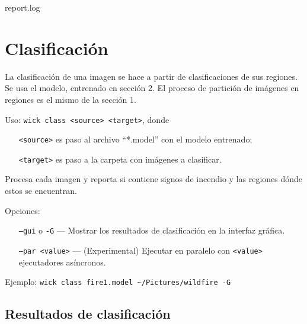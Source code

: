 \documentclass{article}
\begin{document}
\begin{center}
    
                    {report.log} 
\end{center}
\begin{center}
    \resizebox{\textwidth}{!}{  }
\end{center}


\section{Clasificación}

La clasificación de una imagen se hace a partir de clasificaciones de sus regiones.
Se usa el modelo, entrenado en sección 2.
El proceso de partición de imágenes en regiones es el mismo de la sección 1.

\medskip
\noindent
Uso: \verb|wick class <source> <target>|, donde
\begin{itemize}[leftmargin=9em]
\item[\texttt{<source>}] es paso al archivo ``*.model'' con el modelo entrenado;
\item[\texttt{<target>}] es paso a la carpeta con imágenes a clasificar.
\end{itemize}

Procesa cada imagen y reporta si contiene signos de incendio y las regiones dónde estos se encuentran.

\medskip
\noindent
Opciones:
\begin{itemize}[align=left]
\item[\texttt{--gui} o \texttt{-G}] --- Mostrar los resultados de clasificación en la interfaz gráfica.
\item[\texttt{--par <value>}] --- (Experimental) Ejecutar en paralelo con \verb|<value>| ejecutadores asíncronos.
\end{itemize}

\noindent
Ejemplo: \verb|wick class fire1.model ~/Pictures/wildfire -G|



\subsection{Resultados de clasificación}
\end{document}
